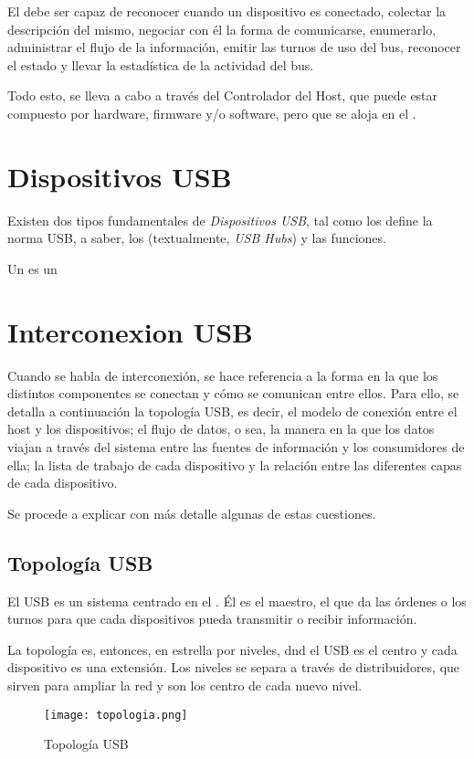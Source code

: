   El \host debe ser capaz de reconocer cuando un dispositivo es conectado,
  colectar la descripción del mismo, negociar con él la forma de comunicarse,
  enumerarlo, administrar el flujo de la información, emitir las turnos de uso
  del bus, reconocer el estado y llevar la estadística de la actividad del bus.

  Todo esto, se lleva a cabo a través del Controlador del Host, que puede estar
  compuesto por hardware, firmware y/o software, pero que se aloja en el \host.

  \section{Dispositivos USB}
  Existen dos tipos fundamentales de {\it Dispositivos USB}, tal como los define
  la norma USB, a saber, los \hubs (textualmente, {\it USB Hubs}) y
  las funciones.

  Un \hub es un 

  \section{Interconexion USB}
  Cuando se habla de interconexión, se hace referencia a la forma en la que los
  distintos componentes se conectan y cómo se comunican entre ellos. Para ello,
  se detalla a continuación la topología USB, es decir, el modelo de conexión
  entre el host y los dispositivos; el flujo de datos, o sea, la manera en la
  que los datos viajan a través del sistema entre las fuentes de información y
  los consumidores de ella; la lista de trabajo de cada dispositivo y la
  relación entre las diferentes capas de cada dispositivo.

  Se procede a explicar con más detalle algunas de estas cuestiones.

    \subsection{Topología USB}
    El USB es un sistema centrado en el \host. Él es el maestro, el que da las
    órdenes o los turnos para que cada dispositivos pueda transmitir o recibir
    información.

    La topología es, entonces, en estrella por niveles, dnd el \host USB es el
    centro y cada dispositivo es una extensión. Los niveles se separa a través
    de distribuidores, que sirven para ampliar la red y son los centro de cada
    nuevo nivel.

    \begin{figure}
	    \centering
		\texttt{[image: topologia.png]}
		\caption{Topología USB}
		\label{}
    \end{figure}


